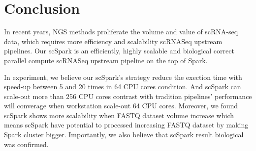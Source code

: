 \documentclass[conference]{IEEEtran}
\begin{document}

\section{Conclusion}

In recent years, NGS methods proliferate the volume and value of scRNA-seq data, which requires more efficiency and scalability scRNASeq upstream pipelines.
Our scSpark is an efficiently, highly scalable and biological correct parallel compute scRNASeq upstream pipeline on the top of Spark.

In experiment, we believe our scSpark's strategy reduce the exection time with speed-up between 5 and 20 times in 64 CPU cores condition.
And scSpark can scale-out more than 256 CPU cores contrast with tradition pipelines' performance will converage when workstation scale-out 64 CPU cores.
Moreover, we found scSpark shows more scalability when FASTQ dataset volume increase which means scSpark have potential to processed increasing FASTQ dataset by making Spark cluster bigger.
Importantly, we also believe that scSpark result biological was confirmed.



\end{document}
